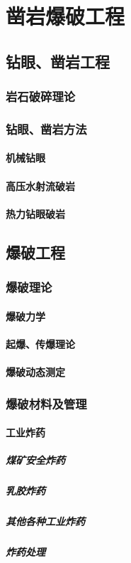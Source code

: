 \documentclass[UTF8]{../../ApplicationUniverse}
\begin{document}
\section{凿岩爆破工程}
    \subsection{钻眼、凿岩工程}
        \subsubsection{岩石破碎理论}
        \subsubsection{钻眼、凿岩方法}
            \paragraph{机械钻眼}
            \paragraph{高压水射流破岩}
            \paragraph{热力钻眼破岩}

    \subsection{爆破工程}
        \subsubsection{爆破理论}
            \paragraph{爆破力学}
            \paragraph{起爆、传爆理论}
            \paragraph{爆破动态测定}
        \subsubsection{爆破材料及管理}
            \paragraph{工业炸药}
                \subparagraph{煤矿安全炸药}
                \subparagraph{乳胶炸药}
                \subparagraph{其他各种工业炸药}
                \subparagraph{炸药处理}
\end{document}
